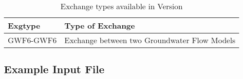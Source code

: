 \begin{table}[h]
\caption{Exchange types available in Version \modflowversion}
\small
\begin{center}
\begin{tabular*}{\columnwidth}{l p{15cm}}
\hline
\hline
Exgtype & Type of Exchange \\
\hline
GWF6-GWF6 & Exchange between two Groundwater Flow Models \\
\hline 
\end{tabular*}
\label{table:exgtype}
\end{center}
\normalsize
\end{table}

\vspace{5mm}
\subsection{Example Input File}


